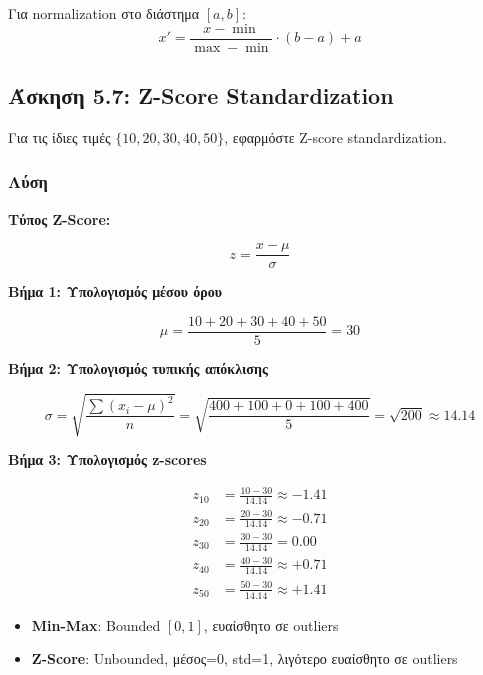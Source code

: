 \begin{infobox}
Για normalization στο διάστημα $[a, b]$:
$$x' = \frac{x - \min}{\max - \min} \cdot (b - a) + a$$
\end{infobox}

\subsection{Άσκηση 5.7: Z-Score Standardization}

\begin{formulabox}[Εκφώνηση]
Για τις ίδιες τιμές $\{10, 20, 30, 40, 50\}$, εφαρμόστε Z-score standardization.
\end{formulabox}

\subsubsection*{Λύση}

\textbf{Τύπος Z-Score:}

$$z = \frac{x - \mu}{\sigma}$$

\textbf{Βήμα 1: Υπολογισμός μέσου όρου}

$$\mu = \frac{10 + 20 + 30 + 40 + 50}{5} = 30$$

\textbf{Βήμα 2: Υπολογισμός τυπικής απόκλισης}

$$\sigma = \sqrt{\frac{\sum(x_i - \mu)^2}{n}} = \sqrt{\frac{400 + 100 + 0 + 100 + 400}{5}} = \sqrt{200} \approx 14.14$$

\textbf{Βήμα 3: Υπολογισμός z-scores}

\begin{align*}
z_{10} &= \frac{10 - 30}{14.14} \approx -1.41 \\
z_{20} &= \frac{20 - 30}{14.14} \approx -0.71 \\
z_{30} &= \frac{30 - 30}{14.14} = 0.00 \\
z_{40} &= \frac{40 - 30}{14.14} \approx +0.71 \\
z_{50} &= \frac{50 - 30}{14.14} \approx +1.41
\end{align*}

\begin{infobox}
\begin{itemize}
    \item \textbf{Min-Max}: Bounded $[0,1]$, ευαίσθητο σε outliers
    \item \textbf{Z-Score}: Unbounded, μέσος=0, std=1, λιγότερο ευαίσθητο σε outliers
\end{itemize}
\end{infobox}

